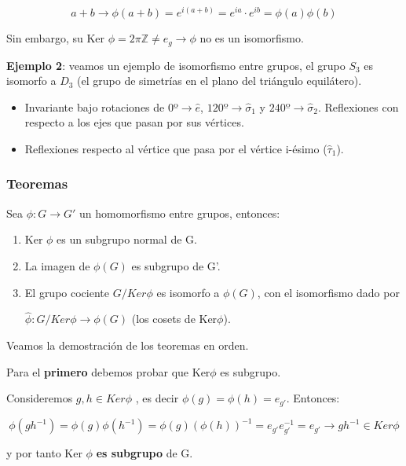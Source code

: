 \documentclass{article}
\begin{document}
 $$a+b \longrightarrow \phi (a+b) =e^{i(a+b)}=e^{ia}\cdot e^{ib}=\phi(a)\phi (b)$$

 Sin embargo, su Ker $\phi =2\pi \mathds{Z}\neq e_g \rightarrow \phi $ no es un isomorfismo.

 \bigskip
 \textbf{Ejemplo 2}: veamos un ejemplo de isomorfismo entre grupos, el grupo $S_3$ es isomorfo a $D_3$ (el grupo de simetrías en el plano del triángulo equilátero).

 \begin{itemize}
     \item Invariante bajo rotaciones de 0º$\rightarrow \hat{e}$, $120º \rightarrow \hat{\sigma}_1$ y $240º\rightarrow \hat{\sigma} _2$. Reflexiones con respecto a los ejes que pasan por sus vértices.

     \item  Reflexiones respecto al vértice que pasa por el vértice i-ésimo ($\hat{\tau}_1$).
 \end{itemize}

 \subsubsection{Teoremas}

 Sea $\phi : G\rightarrow G'$ un homomorfismo entre grupos, entonces:

      \begin{enumerate}
\item Ker $\phi$ es un subgrupo normal de G.

\item La imagen de $\phi (G)$ es subgrupo de G'.

\item El grupo cociente $G/Ker\phi$ es isomorfo a $\phi (G)$, con el isomorfismo dado por

$\hat{\phi} : G/Ker\phi \rightarrow \phi (G)$ (los cosets de Ker$\phi$).

 \end{enumerate}

 Veamos la demostración de los teoremas en orden.

 \bigskip
 Para el \textbf{primero} debemos probar que Ker$\phi$ es subgrupo.

 \smallskip
 Consideremos $g,h\in Ker\phi $ , es decir $\phi (g) =\phi (h)=e_{g'}$. Entonces:

 $$\phi (gh^{-1})=\phi (g)\phi (h^{-1})=\phi (g)(\phi(h))^{-1}=e_{g'}e_{g'}^{-1}=e_{g'} \rightarrow gh^{-1} \in Ker \phi $$

 y por tanto Ker $\phi$ \textbf{es subgrupo} de G.
 \smallskip
\end{document}
